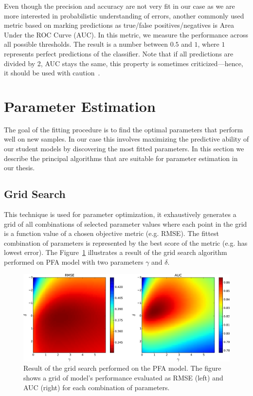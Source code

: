 Even though the precision and accuracy are not very fit in our case as we are more interested in probabilistic understanding of errors, another commonly used metric based on marking predictions as true/false positives/negatives is Area Under the ROC Curve (AUC). In this metric, we measure the performance across all possible thresholds. The result is a number between $0.5$ and $1$, where $1$ represents perfect predictions of the classifier. Note that if all predictions are divided by 2, AUC stays the same, this property is sometimes criticized---hence, it should be used with caution~\cite{Pelanek2015a}.

\section{Parameter Estimation}
\label{parameter-estimation}

The goal of the fitting procedure is to find the optimal parameters that perform well on new samples. In our case this involves maximizing the predictive ability of our student models by discovering the most fitted parameters. In this section we describe the principal algorithms that are suitable for parameter estimation in our thesis.

\subsection{Grid Search}
\label{grid-search}

This technique is used for parameter optimization, it exhaustively generates a grid of all combinations of selected parameter values where each point in the grid is a function value of a chosen objective metric (e.g. RMSE). The fittest combination of parameters is represented by the best score of the metric (e.g. has lowest error). The Figure~\ref{fig-grid-search-rmse-auc} illustrates a result of the grid search algorithm performed on PFA model with two parameters $\gamma$ and $\delta$.

\begin{figure}[htbp]
  \centering
  \includegraphics[width=\textwidth]{img/pfa-grid-search-rmse-auc}
  \caption{Result of the grid search performed on the PFA model. The figure shows a grid of model's performance evaluated as RMSE (left) and AUC (right) for each combination of parameters.}
  \label{fig-grid-search-rmse-auc}
\end{figure}

